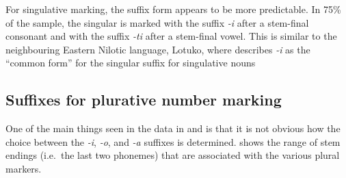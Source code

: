 \documentclass[output=paper]{langsci/langscibook}
\begin{document}
\largerpage
For singulative marking, the suffix form appears to be more predictable.  In 75\% of the sample, the singular is marked with the suffix \textit{-i} after a stem-final consonant and with the suffix \textit{-ti} after a stem-final vowel. This is similar to the neighbouring Eastern Nilotic language, Lotuko, where \citet[7]{Arber1936} describes \textit{-i} as the “common form” for the singular suffix for singulative nouns 

\subsection{Suffixes for plurative number marking}\label{sec:moodie:4.2} 

One of the main things seen in the data in  and  is that it is not obvious how the choice between the \textit{-i}, \textit{-o}, and \textit{-a} suffixes is determined.  shows the range of stem endings (i.e.\ the last two phonemes) that are associated with the various plural markers.
\end{document}
